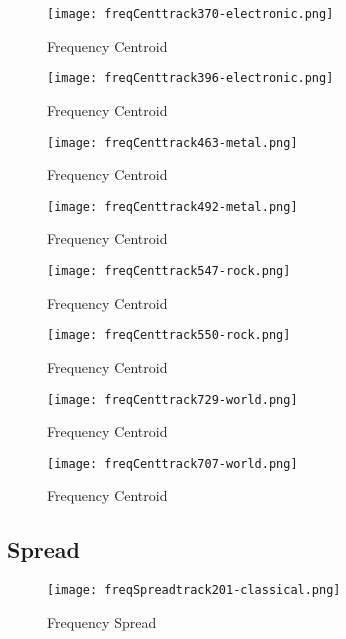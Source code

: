 \documentclass{article} %
\begin{document}
\begin{figure}[H]
\centering
\texttt{[image: freqCenttrack370-electronic.png]}
\caption{Frequency Centroid}
\label{fig:cent370}
\end{figure}


\begin{figure}[H]
\centering
\texttt{[image: freqCenttrack396-electronic.png]}
\caption{Frequency Centroid}
\label{fig:cent396}
\end{figure}


\begin{figure}[H]
\centering
\texttt{[image: freqCenttrack463-metal.png]}
\caption{Frequency Centroid}
\label{fig:cent463}
\end{figure}


\begin{figure}[H]
\centering
\texttt{[image: freqCenttrack492-metal.png]}
\caption{Frequency Centroid}
\label{fig:cent492}
\end{figure}


\begin{figure}[H]
\centering
\texttt{[image: freqCenttrack547-rock.png]}
\caption{Frequency Centroid}
\label{fig:cent547}
\end{figure}


\begin{figure}[H]
\centering
\texttt{[image: freqCenttrack550-rock.png]}
\caption{Frequency Centroid}
\label{fig:cent550}
\end{figure}


\begin{figure}[H]
\centering
\texttt{[image: freqCenttrack729-world.png]}
\caption{Frequency Centroid}
\label{fig:cent729}
\end{figure}


\begin{figure}[H]
\centering
\texttt{[image: freqCenttrack707-world.png]}
\caption{Frequency Centroid}
\label{fig:cent707}
\end{figure}



\clearpage
\subsection{Spread}
\label{sec:spread}

\begin{figure}[H]
\centering
\texttt{[image: freqSpreadtrack201-classical.png]}
\caption{Frequency Spread}
\label{fig:spread201}
\end{figure}
\end{document}
